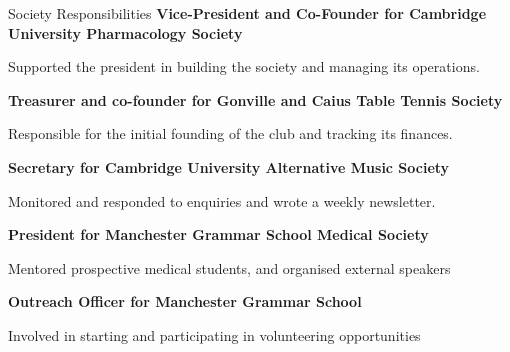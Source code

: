 \begin{rubric}{Society Responsibilities}
\entry*[Current]%
	\textbf{Vice-President and Co-Founder for Cambridge University Pharmacology Society}\par
    Supported the president in building the society and managing its operations.\par
%
\par
\entry*[Former]%
	\textbf{Treasurer and co-founder for Gonville and Caius Table Tennis Society}\par
    Responsible for the initial founding of the club and tracking its finances.\par
	\textbf{Secretary for Cambridge University Alternative Music Society}\par
	Monitored and responded to enquiries and wrote a weekly newsletter.\par
	\textbf{President for Manchester Grammar School Medical Society}\par
    Mentored prospective medical students, and organised external speakers\par
	\textbf{Outreach Officer for Manchester Grammar School }\par
	Involved in starting and participating in volunteering opportunities
%
\end{rubric}
